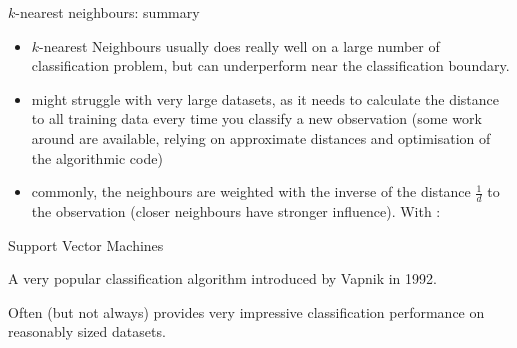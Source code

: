 \documentclass[compress]{beamer}
\begin{document}
    \begin{frame}{$k$-nearest neighbours: summary}

\begin{itemize}
    \item<+-> $k$-nearest Neighbours usually does really well on a large number of
    classification problem, but can underperform near the classification
    boundary.

    \item<+-> might struggle with very large datasets, as it needs to calculate the
    distance to all training data every time you classify a new observation
    (some work around are available, relying on approximate distances and
    optimisation of the algorithmic code)

    \item<+-> commonly, the neighbours are weighted with the inverse of the
        distance $\frac{1}{d}$ to the observation (\ie closer neighbours have
        stronger influence). With :

\end{itemize}

\end{frame}

\begin{frame}{Support Vector Machines}

A very popular classification algorithm introduced by Vapnik in 1992.

\pause

Often (but not always) provides very impressive classification
performance on reasonably sized datasets.

\end{frame}
\end{document}
